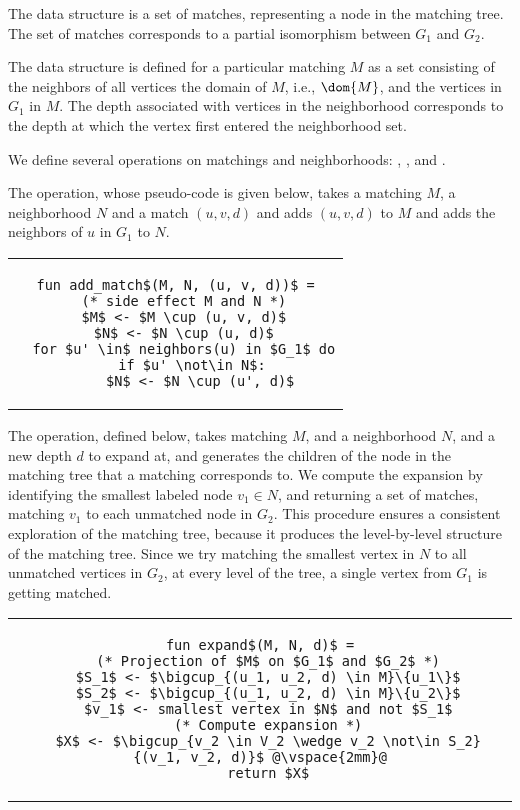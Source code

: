 The  data structure is a set of matches, representing a
node in the matching tree.
%
The set of matches corresponds to a partial isomorphism
between $G_1$ and $G_2$.
%

The  data structure is defined for a particular
matching $M$ as a set consisting of the neighbors of all vertices
the domain of $M$, i.e., $\dom{M}$, and the vertices in $G_1$ in $M$.
%
The depth associated with vertices in the neighborhood corresponds
to the depth at which the vertex first entered the neighborhood set.

We define several operations on  matchings and neighborhoods:
, , and .

The  operation, whose pseudo-code is given below, takes
a matching $M$, a neighborhood $N$ and a match $(u, v, d)$ and adds 
$(u, v, d)$ to $M$ and adds the neighbors of $u$ in $G_1$ to $N$.


\begin{tabular}{c}
\begin{lstlisting}
fun add_match$(M, N, (u, v, d))$ =
  (* side effect M and N *)
  $M$ <- $M \cup (u, v, d)$
  $N$ <- $N \cup (u, d)$
  for $u' \in$ neighbors(u) in $G_1$ do
    if $u' \not\in N$:
      $N$ <- $N \cup (u', d)$
\end{lstlisting}
\end{tabular}


The  operation, defined below, takes matching $M$,
and a neighborhood $N$, and a new depth $d$ to expand at, and
generates the children
of the node in the matching tree that a matching corresponds to.
%
We compute the expansion by identifying
the smallest labeled node $v_1 \in N$, and returning
a set of matches, matching $v_1$ to each unmatched node in $G_2$.
%
This procedure ensures a consistent exploration of the matching tree,
because it produces the level-by-level structure of the matching tree.
%
Since we try matching the smallest vertex in $N$ to all unmatched vertices in
$G_2$, at every level of the tree, a single vertex from $G_1$ is getting matched.

\begin{tabular}{c}
\begin{lstlisting}
fun expand$(M, N, d)$ =
  (* Projection of $M$ on $G_1$ and $G_2$ *)
  $S_1$ <- $\bigcup_{(u_1, u_2, d) \in M}\{u_1\}$
  $S_2$ <- $\bigcup_{(u_1, u_2, d) \in M}\{u_2\}$
  $v_1$ <- smallest vertex in $N$ and not $S_1$
  (* Compute expansion *)
  $X$ <- $\bigcup_{v_2 \in V_2 \wedge v_2 \not\in S_2}{(v_1, v_2, d)}$ @\vspace{2mm}@
  return $X$
\end{lstlisting}
\end{tabular}

